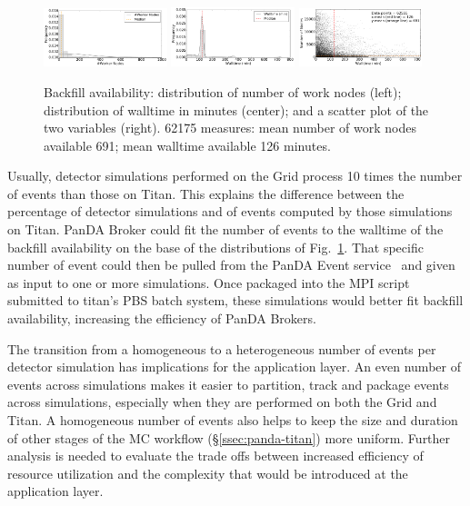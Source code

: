 \begin{figure}%
    \includegraphics[clip,width=0.32\textwidth]{figures/titan_backfill_wnodes_distribution.pdf}
    \includegraphics[clip,width=0.32\textwidth]{figures/titan_backfill_walltime_distribution.pdf}
    \includegraphics[clip,width=0.32\textwidth]{figures/titan_backfill_avail.png}
    \caption{Backfill availability: distribution of number of work nodes (left);
    distribution of walltime in minutes (center); and a scatter plot of the two
    variables (right). 62175 measures: mean number of work nodes available 691;
    mean walltime available 126 minutes.}
\label{fig:backfill-distrib}
\end{figure}

Usually, detector simulations performed on the Grid process 10 times the number
of events than those on Titan. This explains the difference between the
percentage of detector simulations and of events computed by those simulations
on Titan. PanDA Broker could fit the number of events to the walltime of the
backfill availability on the base of the distributions of
Fig.~\ref{fig:backfill-distrib}. That specific number of event could then be
pulled from the PanDA Event service~\cite{calafiura2015atlas} and given as input
to one or more simulations. Once packaged into the MPI script submitted to
titan's PBS batch system, these simulations would better fit backfill
availability, increasing the efficiency of PanDA Brokers.

The transition from a homogeneous to a heterogeneous number of events per
detector simulation has implications for the application layer. An even number
of events across simulations makes it easier to partition, track and package
events across simulations, especially when they are performed on both the Grid
and Titan. A homogeneous number of events also helps to keep the size and
duration of other stages of the MC workflow (\S\ref{ssec:panda-titan}) more
uniform. Further analysis is needed to evaluate the trade offs between increased
efficiency of resource utilization and the complexity that would be introduced
at the application layer.


